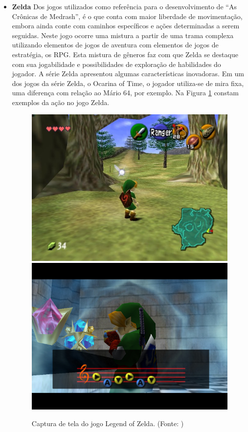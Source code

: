 \begin{itemize}
\item {\bf Zelda}
Dos jogos utilizados como referência para o desenvolvimento de
 ``As Crônicas de Medrash'',
é o que conta com maior liberdade de movimentação, embora ainda conte com 
caminhos específicos e ações determinadas a serem seguidas.
Neste jogo ocorre uma mistura a partir de uma trama complexa utilizando 
elementos de jogos de aventura com elementos de jogos de estratégia, os RPG. 
Esta mistura de gêneros faz com que Zelda se destaque com sua jogabilidade e
 possibilidades de exploração de habilidades do jogador. 
A série Zelda apresentou algumas características inovadoras. Em um dos jogos
 da série Zelda, o Ocarina of Time, o jogador utiliza-se de mira fixa, uma diferença 
com relação ao Mário 64, por exemplo.
Na Figura \ref{img:zelda} constam exemplos da ação no jogo Zelda.

\begin{figure}[!ht]
 \centering
 \includegraphics[scale=0.35]{Imagens/zelda1.png}
 \includegraphics[scale=0.35]{Imagens/zelda2.png}
 \caption{Captura de tela do jogo Legend of Zelda.
(Fonte: \cite{bib:zelda01})}
 \label{img:zelda}
\end{figure}


\end{itemize}
